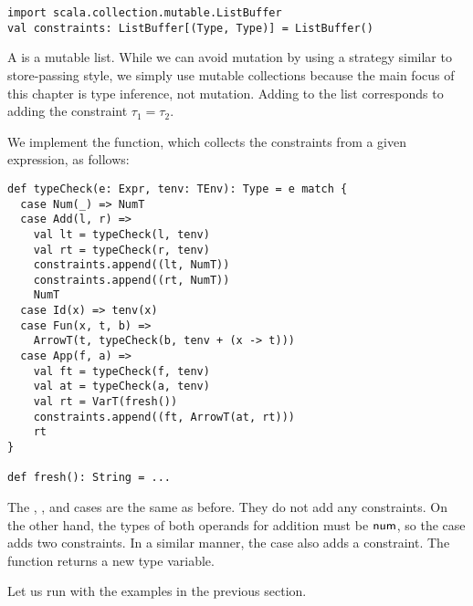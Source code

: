 \begin{verbatim}
import scala.collection.mutable.ListBuffer
val constraints: ListBuffer[(Type, Type)] = ListBuffer()
\end{verbatim}

A  is a mutable list. While we can avoid mutation by using a
strategy similar to store-passing style, we simply use mutable collections
because the main focus of this chapter is type inference, not mutation. Adding
 to the list corresponds to adding the constraint
$\tau_1=\tau_2$.

We implement the  function, which collects the constraints
from a given expression, as follows:

\begin{verbatim}
def typeCheck(e: Expr, tenv: TEnv): Type = e match {
  case Num(_) => NumT
  case Add(l, r) =>
    val lt = typeCheck(l, tenv)
    val rt = typeCheck(r, tenv)
    constraints.append((lt, NumT))
    constraints.append((rt, NumT))
    NumT
  case Id(x) => tenv(x)
  case Fun(x, t, b) =>
    ArrowT(t, typeCheck(b, tenv + (x -> t)))
  case App(f, a) =>
    val ft = typeCheck(f, tenv)
    val at = typeCheck(a, tenv)
    val rt = VarT(fresh())
    constraints.append((ft, ArrowT(at, rt)))
    rt
}

def fresh(): String = ...
\end{verbatim}

The , , and  cases are the same as before. They do
not add any constraints. On the other hand, the types of both operands for
addition must be $\textsf{num}$, so the  case adds two constraints. In a
similar manner, the  case also adds a constraint. The 
function returns a new type variable.

Let us run  with the examples in the previous section.

